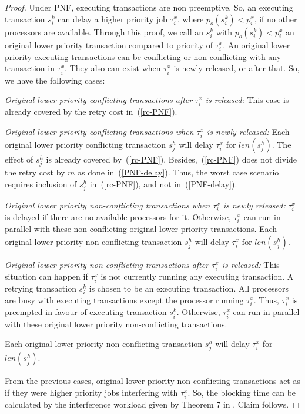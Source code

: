 %
\begin{proof}\normalfont
%
Under PNF, executing transactions are non preemptive. So, an executing transaction $s_i^k$ can delay a higher priority job $\tau_i^x$, where $p_o\left(s_i^k\right)<p_i^x$, if no other processors are available. Through this proof, we call an $s_i^k$ with $p_o\left(s_i^k\right)<p_i^x$ an original lower priority transaction compared to priority of $\tau_i^x$. An original lower priority executing transactions can be conflicting or non-conflicting with any transaction in $\tau_{i}^{x}$. They also can exist when $\tau_i^x$ is newly released, or after that. So, we have the following cases:

\emph{Original lower priority conflicting transactions after $\tau_i^x$ is released:} This case is already covered by the retry cost in~(\ref{rc-PNF}).

\emph{Original lower priority conflicting transactions when $\tau_i^x$ is newly released:} Each original lower priority conflicting transaction $s_j^h$ will delay $\tau_i^x$ for $len(s_j^h)$. The effect of $s_j^h$ is already covered by~(\ref{rc-PNF}). Besides,~(\ref{rc-PNF}) does not divide the retry cost by $m$ as done in~(\ref{PNF-delay}). Thus, the worst case scenario requires inclusion of $s_j^h$ in~(\ref{rc-PNF}), and not in~(\ref{PNF-delay}).

\emph{Original lower priority non-conflicting transactions when $\tau_i^x$ is newly released:} $\tau_i^x$ is delayed if there are no available processors for it. Otherwise, $\tau_i^x$ can run in parallel with these non-conflicting original lower priority transactions. Each original lower priority non-conflicting transaction $s_j^h$ will delay $\tau_i^x$ for $len(s_j^h)$.

\emph{Original lower priority non-conflicting transactions after $\tau_i^x$ is released:} This situation can happen if $\tau_i^x$ is not currently running any executing transaction. A retrying transaction $s_i^k$ is chosen to be an executing transaction. All processors are busy with executing transactions except the processor running $\tau_i^x$. Thus, $\tau_i^x$ is preempted in favour of executing transaction $s_i^k$. Otherwise, $\tau_i^x$ can run in parallel with these original lower priority non-conflicting transactions.

Each original lower priority non-conflicting transaction $s_j^h$ will delay $\tau_i^x$ for $len(s_j^h)$.

From the previous cases, original lower priority non-conflicting transactions act as if they were higher priority jobs interfering with $\tau_{i}^{x}$. So, the blocking time can be calculated by the interference workload given by Theorem 7 in \cite{key-2}. Claim follows.
%
\end{proof}
